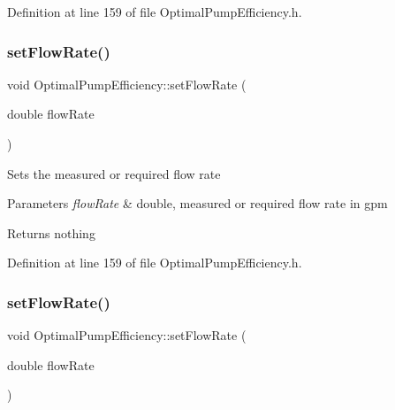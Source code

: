 Definition at line 159 of file Optimal\+Pump\+Efficiency.\+h.

\mbox{\label{class_optimal_pump_efficiency_a90067b57c559fd3274fb8d6e00f6221d}} 
\subsubsection{\texorpdfstring{set\+Flow\+Rate()}{setFlowRate()}\hspace{0.1cm}{\footnotesize\ttfamily [2/3]}}
{\footnotesize\ttfamily void Optimal\+Pump\+Efficiency\+::set\+Flow\+Rate (\begin{DoxyParamCaption}\item[{double}]{flow\+Rate }\end{DoxyParamCaption})\hspace{0.3cm}{\ttfamily [inline]}}

Sets the measured or required flow rate


\begin{DoxyParams}{Parameters}
{\em flow\+Rate} & double, measured or required flow rate in gpm\\
\hline
\end{DoxyParams}
\begin{DoxyReturn}{Returns}
nothing 
\end{DoxyReturn}


Definition at line 159 of file Optimal\+Pump\+Efficiency.\+h.

\mbox{\label{class_optimal_pump_efficiency_a90067b57c559fd3274fb8d6e00f6221d}} 
\subsubsection{\texorpdfstring{set\+Flow\+Rate()}{setFlowRate()}\hspace{0.1cm}{\footnotesize\ttfamily [3/3]}}
{\footnotesize\ttfamily void Optimal\+Pump\+Efficiency\+::set\+Flow\+Rate (\begin{DoxyParamCaption}\item[{double}]{flow\+Rate }\end{DoxyParamCaption})\hspace{0.3cm}{\ttfamily [inline]}}

